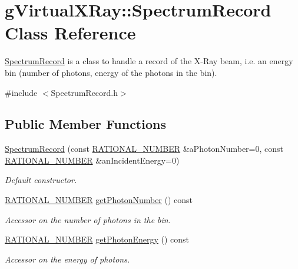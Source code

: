 \hypertarget{classg_virtual_x_ray_1_1_spectrum_record}{
\section{gVirtualXRay::SpectrumRecord Class Reference}
\label{classg_virtual_x_ray_1_1_spectrum_record}
}


\hyperlink{classg_virtual_x_ray_1_1_spectrum_record}{SpectrumRecord} is a class to handle a record of the X-\/Ray beam, i.e. an energy bin (number of photons, energy of the photons in the bin).  




{\ttfamily \#include $<$SpectrumRecord.h$>$}

\subsection*{Public Member Functions}
\begin{DoxyCompactItemize}
\item 
\hyperlink{classg_virtual_x_ray_1_1_spectrum_record_a339181db91edbe3a0d293004de2334f5}{SpectrumRecord} (const \hyperlink{namespace_utilities_a40969b96bd8d847b962e297cb79f08ce}{RATIONAL\_\-NUMBER} \&aPhotonNumber=0, const \hyperlink{namespace_utilities_a40969b96bd8d847b962e297cb79f08ce}{RATIONAL\_\-NUMBER} \&anIncidentEnergy=0)
\begin{DoxyCompactList}\small\item\em Default constructor. \end{DoxyCompactList}\item 
\hyperlink{namespace_utilities_a40969b96bd8d847b962e297cb79f08ce}{RATIONAL\_\-NUMBER} \hyperlink{classg_virtual_x_ray_1_1_spectrum_record_a13ab4844fceeeb6612987dc9aef2f7c0}{getPhotonNumber} () const 
\begin{DoxyCompactList}\small\item\em Accessor on the number of photons in the bin. \end{DoxyCompactList}\item 
\hyperlink{namespace_utilities_a40969b96bd8d847b962e297cb79f08ce}{RATIONAL\_\-NUMBER} \hyperlink{classg_virtual_x_ray_1_1_spectrum_record_ab361257ffb98e889f68820c12f267ef1}{getPhotonEnergy} () const 
\begin{DoxyCompactList}\small\item\em Accessor on the energy of photons. \end{DoxyCompactList}\end{DoxyCompactItemize}
